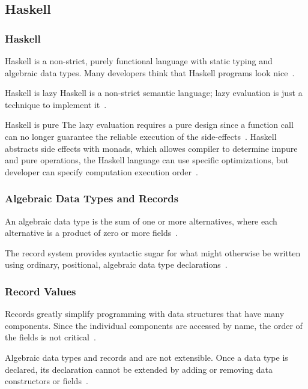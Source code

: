 \subsection{Haskell}
\begin{frame}\frametitle{Haskell}

Haskell is a non-strict, purely functional language with static typing and algebraic data types. Many developers think that Haskell programs look nice~\cite{history-of-haskell}.

\begin{block}{Haskell is lazy}
    Haskell is a non-strict semantic language; lazy evaluation is just a technique to implement it~\cite{history-of-haskell}.
\end{block}

\begin{block}{Haskell is pure}
The lazy evaluation requires a pure design since a function call can no longer guarantee the reliable execution of the side-effects~\cite{history-of-haskell}.
Haskell abstracts side effects with monads, which allowes compiler to determine impure and pure operations, the Haskell language can use specific optimizations, but developer can specify computation execution order~\cite{history-of-haskell}.
\end{block}

\end{frame}

\begin{frame}\frametitle{Algebraic Data Types and Records}

An algebraic data type is the sum of one or more alternatives, where each alternative is a product of zero or more fields~\cite{history-of-haskell}. 
        

The record system provides syntactic sugar for what might otherwise be written using ordinary, positional, algebraic data type declarations~\cite{lw-ext-records}. 


\end{frame}

\begin{frame}\frametitle{Record Values}

Records greatly simplify programming with data structures that have many components. Since the individual components are accessed by name, the order of the fields is not critical~\cite{lw-ext-records}.


Algebraic data types and records and are not extensible. Once a data type is declared, its declaration cannot be extended by adding or removing data constructors or fields~\cite{hlist,lw-ext-records,trees-that-grow}. 

\end{frame}

